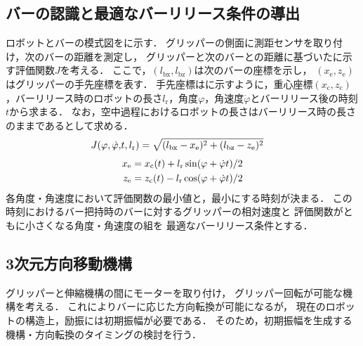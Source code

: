 \begin{small}
\subsection{バーの認識と最適なバーリリース条件の導出}
\vspace{-1mm}
ロボットとバーの模式図をに示す．
グリッパーの側面に測距センサを取り付け，次のバーの距離を測定し，
グリッパーと次のバーとの距離に基づいたに示す評価関数$J$を考える．
ここで，$(l_{\mathrm{bx}},l_{\mathrm{bz}})$は次のバーの座標を示し，
$(x_{\mathrm{e}},z_{\mathrm{e}})$はグリッパーの手先座標を表す．
手先座標はに示すように，重心座標$(x_{\mathrm{c}},z_{\mathrm{c}})$，バーリリース時のロボットの長さ$l_{\mathrm{r}}$，角度$\varphi$，角速度$\dot{\varphi}$とバーリリース後の時刻$t$から求まる．
なお，空中過程におけるロボットの長さはバーリリース時の長さのままであるとして求める．
\setlength{\abovedisplayskip}{2pt}
\setlength{\belowdisplayskip}{3pt}
\begin{eqnarray}
    \equlabel{J}
    J(\varphi,\dot{\varphi},&t,l_{\mathrm{r}})
    =\sqrt{(l_{\mathrm{bx}}-x_{\mathrm{e}})^2+(l_{\mathrm{bz}}-z_{\mathrm{e}})^2}
    \equlabel{J}
    \end{eqnarray}
\begin{eqnarray}
        \equlabel{x-z}
        \begin{split}
        x_{\mathrm{e}}=x_{\mathrm{c}}(t)+l_{\mathrm{r}}\sin(\varphi+\dot{\varphi}t)/2\\
        z_{\mathrm{e}}=z_{\mathrm{c}}(t)-l_{\mathrm{r}}\cos(\varphi+\dot{\varphi}t)/2
        \end{split}
        \end{eqnarray}
各角度・角速度において評価関数の最小値と，最小にする時刻が決まる．
この時刻におけるバー把持時のバーに対するグリッパーの相対速度と
評価関数がともに小さくなる角度・角速度の組を
最適なバーリリース条件とする．
\vspace{-1mm}
\subsection{3次元方向移動機構}
\vspace{-1mm}
グリッパーと伸縮機構の間にモーターを取り付け，
グリッパー回転が可能な機構を考える．
これによりバーに応じた方向転換が可能になるが，
現在のロボットの構造上，励振には初期振幅が必要である．
そのため，初期振幅を生成する機構・方向転換のタイミングの検討を行う．
\vspace{-1mm}

\end{small}
